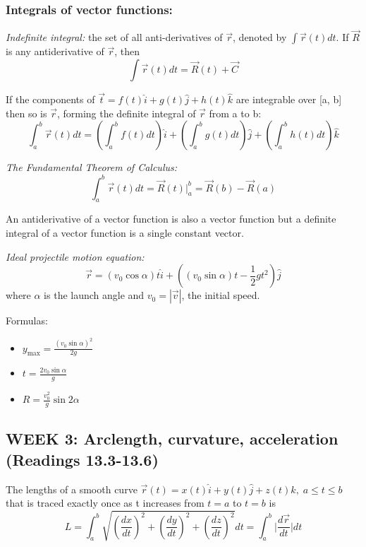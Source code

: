 \documentclass[12pt]{article}
\begin{document}
\subsubsection{Integrals of vector functions:}
\emph{Indefinite integral:} the set of all anti-derivatives of $\vec{r}$, denoted by $\int \vec{r}(t) dt$. If $\vec{R}$ is any antiderivative of $\vec{r}$, then
\[\int \vec{r}(t) dt = \vec{R}(t) + \vec{C}\]

If the components of $\vec{t} = f(t) \hat{i} + g(t)\hat{j} + h(t) \hat{k}$ are integrable over [a, b] then so is $\vec{r}$, forming the definite integral of $\vec{r}$ from a to b:
\[\int_a^b \vec{r}(t) dt = \left(\int_a^b f(t) dt\right) \hat{i} + \left(\int_a^b g(t) dt\right) \hat{j} +\left(\int_a^b h(t) dt\right) \hat{k}\]

\emph{The Fundamental Theorem of Calculus:}
\[\int_a^b \vec{r}(t) dt = \vec{R}(t) \Bigr|_a^b = \vec{R}(b) - \vec{R}(a)\]

An antiderivative of a vector function is also a vector function but a definite integral of a vector function is a single constant vector. 

\emph{Ideal projectile motion equation:}
\[\vec{r} = (v_0 \cos \alpha)t \hat{i} + \left((v_0 \sin \alpha)t - \frac{1}{2}gt^2\right) \hat{j}\]
where $\alpha$ is the launch angle and $v_0 = |\vec{v}|$, the initial speed.

Formulas:
\begin{itemize}
    \item $y_{\text{max}} =  \frac{(v_0 \sin \alpha)^2}{2g}$
    \item $t = \frac{2v_0 \sin \alpha}{g}$
    \item $R = \frac{v_0^2}{g}\sin 2\alpha$
\end{itemize}

\subsection{WEEK 3: Arclength, curvature, acceleration (Readings 13.3-13.6)}

The lengths of a smooth curve $\vec{r}(t) = x(t) \hat{i} + y(t) \hat{j} + z(t) \hat{k}, \; a \leq t\leq b$ that is traced exactly once as t increases from $t = a$ to $t=b$ is
\[L = \int_a^b \sqrt{\left(\frac{dx}{dt}\right)^2 + \left(\frac{dy}{dt}\right)^2 + \left(\frac{dz}{dt}\right)^2}dt = \int_a^b \biggl|\frac{d\vec{r}}{dt}\biggr| dt\]
\end{document}
